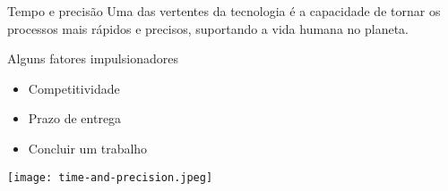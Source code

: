 \begin{frame}[t]{Tempo e precisão}
    \transboxout[duration=0.5]
    Uma das vertentes da tecnologia é a capacidade de tornar os processos mais rápidos e precisos, suportando a vida humana no planeta.

    \vspace*{0.2cm}
    Alguns fatores impulsionadores
		\begin{itemize}
			\item Competitividade
			\item Prazo de entrega
			\item Concluir um trabalho 
		\end{itemize}

    \vspace*{0.2cm}
    \texttt{[image: time-and-precision.jpeg]}

    \begin{columns}
    \end{columns}
\end{frame}

